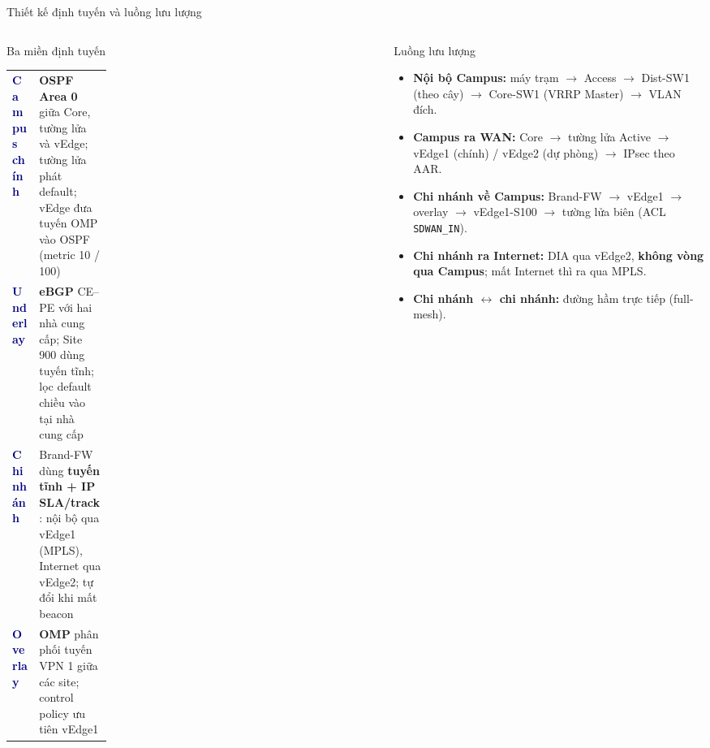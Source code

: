 \documentclass[aspectratio=169, 10pt, xcolor={table}]{beamer}
\renewcommand{\arraystretch}{1.25}
\newcommand{\hd}[1]{\textcolor{navy}{\textbf{#1}}}
\newcommand{\compactlist}{\setlength{\itemsep}{1pt}\setlength{\parskip}{0pt}}
\begin{document}
\begin{frame}{Thiết kế định tuyến và luồng lưu lượng}
    \begin{columns}[T]
        \begin{column}{0.49\textwidth}
            \begin{card}{Ba miền định tuyến}
                \scriptsize
                \renewcommand{\arraystretch}{1.12}
                \begin{tabularx}{\linewidth}{@{}L{0.27\linewidth}Y@{}}
                    \hd{Campus chính} & \textbf{OSPF Area 0} giữa Core, tường lửa và vEdge; tường lửa phát default; vEdge đưa tuyến OMP vào OSPF (metric 10 / 100) \\
                    \hd{Underlay} & \textbf{eBGP} CE--PE với hai nhà cung cấp; Site 900 dùng tuyến tĩnh; lọc default chiều vào tại nhà cung cấp \\
                    \hd{Chi nhánh} & Brand-FW dùng \textbf{tuyến tĩnh + IP SLA/track}: nội bộ qua vEdge1 (MPLS), Internet qua vEdge2; tự đổi khi mất beacon \\
                    \hd{Overlay} & \textbf{OMP} phân phối tuyến VPN 1 giữa các site; control policy ưu tiên vEdge1 \\
                \end{tabularx}
            \end{card}
        \end{column}
        \begin{column}{0.49\textwidth}
            \begin{card}[accent]{Luồng lưu lượng}
                \scriptsize
                \begin{itemize}\compactlist
                    \item \textbf{Nội bộ Campus:} máy trạm $\rightarrow$ Access $\rightarrow$ Dist-SW1 (theo cây) $\rightarrow$ Core-SW1 (VRRP Master) $\rightarrow$ VLAN đích.
                    \item \textbf{Campus ra WAN:} Core $\rightarrow$ tường lửa Active $\rightarrow$ vEdge1 (chính) / vEdge2 (dự phòng) $\rightarrow$ IPsec theo AAR.
                    \item \textbf{Chi nhánh về Campus:} Brand-FW $\rightarrow$ vEdge1 $\rightarrow$ overlay $\rightarrow$ vEdge1-S100 $\rightarrow$ tường lửa biên (ACL \texttt{SDWAN\_IN}).
                    \item \textbf{Chi nhánh ra Internet:} DIA qua vEdge2, \textbf{không vòng qua Campus}; mất Internet thì ra qua MPLS.
                    \item \textbf{Chi nhánh $\leftrightarrow$ chi nhánh:} đường hầm trực tiếp (full-mesh).

\end{itemize}
\end{card}
\end{column}
\end{columns}
\end{frame}
\end{document}
